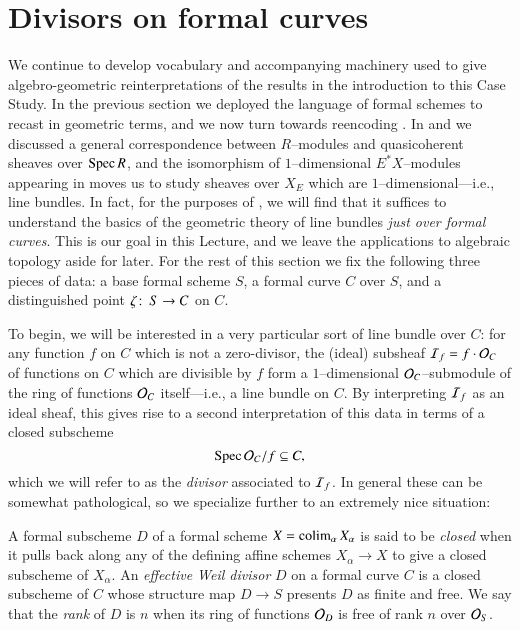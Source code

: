 \section{Divisors on formal curves}\label{CurveDivisorsSection}

We continue to develop vocabulary and accompanying machinery used to give algebro-geometric reinterpretations of the results in the introduction to this Case Study.  In the previous section we deployed the language of formal schemes to recast  in geometric terms, and we now turn towards reencoding .  In  and  we discussed a general correspondence between $R$--modules and quasicoherent sheaves over $\operatorname{Spec} R$, and the isomorphism of $1$--dimensional $E^* X$--modules appearing in  moves us to study sheaves over $X_E$ which are $1$--dimensional---i.e., line bundles.  In fact, for the purposes of , we will find that it suffices to understand the basics of the geometric theory of line bundles \emph{just over formal curves}.  This is our goal in this Lecture, and we leave the applications to algebraic topology aside for later.  For the rest of this section we fix the following three pieces of data: a base formal scheme $S$, a formal curve $C$ over $S$, and a distinguished point $\zeta\colon\thinspace S \to C$ on $C$.

To begin, we will be interested in a very particular sort of line bundle over $C$: for any function $f$ on $C$ which is not a zero-divisor, the (ideal) subsheaf $\mathcal{I}_f = f \cdot \mathcal{O}_C$ of functions on $C$ which are divisible by $f$ form a $1$--dimensional $\mathcal{O}_C$--submodule of the ring of functions $\mathcal{O}_C$ itself---i.e., a line bundle on $C$.  By interpreting $\mathcal{I}_f$ as an ideal sheaf, this gives rise to a second interpretation of this data in terms of a closed subscheme \[\operatorname{Spec} \mathcal{O}_C / f \subseteq C,\] which we will refer to as the \textit{divisor} associated to $\mathcal{I}_f$.  In general these can be somewhat pathological, so we specialize further to an extremely nice situation:

\begin{definition}
A formal subscheme $D$ of a formal scheme $X = \operatorname*{colim}_\alpha X_\alpha$ is said to be \textit{closed} when it pulls back along any of the defining affine schemes $X_\alpha \to X$ to give a closed subscheme of $X_\alpha$.  An \textit{effective Weil divisor} $D$ on a formal curve $C$ is a closed subscheme of $C$ whose structure map $D \to S$ presents $D$ as finite and free.  We say that the \textit{rank} of $D$ is $n$ when its ring of functions $\mathcal{O}_D$ is free of rank $n$ over $\mathcal{O}_S$.
\end{definition}

